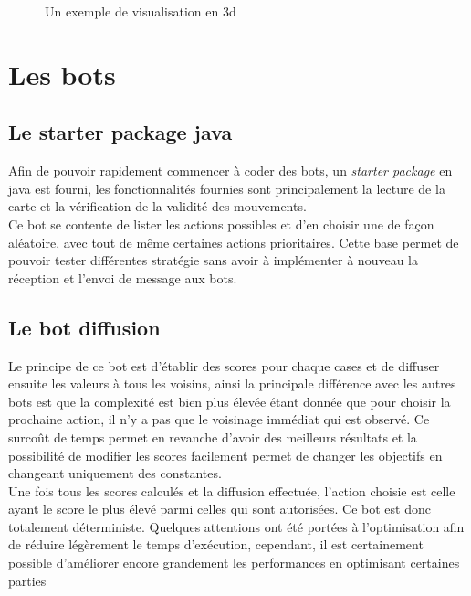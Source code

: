 \documentclass[10pt,a4paper]{report}
\begin{document}
\begin{figure}[H]
	\caption{\label{fig:3d_graph} Un exemple de visualisation en 3d}
\end{figure}

\chapter{Les bots}
\section{Le starter package java}
Afin de pouvoir rapidement commencer à coder des bots, un \emph{starter package}
en java est fourni, les fonctionnalités fournies sont principalement la lecture
de la carte et la vérification de la validité des mouvements.
\\
Ce bot se contente de lister les actions possibles et d'en choisir une de façon
aléatoire, avec tout de même certaines actions prioritaires. Cette base permet
de pouvoir tester différentes stratégie sans avoir à implémenter à nouveau la
réception et l'envoi de message aux bots.

\section{Le bot diffusion}
Le principe de ce bot est d'établir des scores pour chaque cases et de diffuser ensuite
les valeurs à tous les voisins, ainsi la principale différence avec les autres bots est
que la complexité est bien plus élevée étant donnée que pour choisir la prochaine
action, il n'y a pas que le voisinage immédiat qui est observé. Ce surcoût de temps
permet en revanche d'avoir des meilleurs résultats et la possibilité de modifier les
scores facilement permet de changer les objectifs en changeant uniquement des
constantes.
\\
Une fois tous les scores calculés et la diffusion effectuée, l'action choisie est celle
ayant le score le plus élevé parmi celles qui sont autorisées. Ce bot est donc
totalement déterministe. Quelques attentions ont été portées à l'optimisation afin de
réduire légèrement le temps d'exécution, cependant, il est certainement possible
d'améliorer encore grandement les performances en optimisant certaines parties
\end{document}

